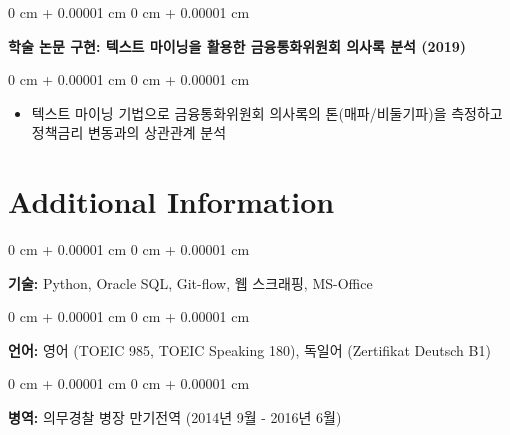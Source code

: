 \documentclass[10pt, letterpaper]{article}
\newenvironment{highlights}{
    \begin{itemize}[
        topsep=0.10 cm,
        parsep=0.10 cm,
        partopsep=0pt,
        itemsep=0pt,
        leftmargin=0 cm + 10pt
    ]
}{
    \end{itemize}
}
\newenvironment{onecolentry}{
    \begin{adjustwidth}{
        0 cm + 0.00001 cm
    }{
        0 cm + 0.00001 cm
    }
}{
    \end{adjustwidth}
}
\begin{document}
        \vspace{0.2 cm}

        \begin{onecolentry}
            \textbf{학술 논문 구현: 텍스트 마이닝을 활용한 금융통화위원회 의사록 분석 (2019)}\end{onecolentry}

        \vspace{0.10 cm}
        \begin{onecolentry}
            \begin{highlights}
                \item 텍스트 마이닝 기법으로 금융통화위원회 의사록의 톤(매파/비둘기파)을 측정하고 정책금리 변동과의 상관관계 분석
            \end{highlights}
        \end{onecolentry}



    
    \section{Additional Information}

        
        \begin{onecolentry}
            \textbf{기술:} Python, Oracle SQL, Git-flow, 웹 스크래핑, MS-Office
        \end{onecolentry}

        \vspace{0.2 cm}

        \begin{onecolentry}
            \textbf{언어:} 영어 (TOEIC 985, TOEIC Speaking 180), 독일어 (Zertifikat Deutsch B1)
        \end{onecolentry}

        \vspace{0.2 cm}

        \begin{onecolentry}
            \textbf{병역:} 의무경찰 병장 만기전역 (2014년 9월 - 2016년 6월)
        \end{onecolentry}


    
\end{document}
